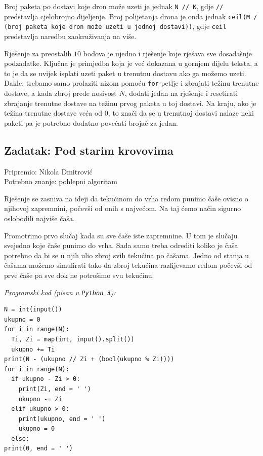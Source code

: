 \documentclass[a4paper]{article}
\begin{document}
Broj paketa po dostavi koje dron može uzeti je jednak \texttt{N // K}, gdje
\texttt{//} predstavlja cjelobrojno dijeljenje. Broj polijetanja drona je onda
jednak \texttt{ceil(M / (broj paketa koje dron može uzeti u jednoj dostavi))},
gdje \texttt{ceil} predstavlja naredbu zaokruživanja na više.

Rješenje za preostalih $10$ bodova je ujedno i rješenje koje rješava sve
dosadašnje podzadatke. Ključna je primjedba koja je već dokazana u gornjem
dijelu teksta, a to je da se uvijek isplati uzeti paket u trenutnu dostavu ako
ga možemo uzeti. Dakle, trebamo samo prolaziti nizom pomoću \texttt{for}-petlje
i zbrajati težinu trenutne dostave, a kada zbroj pređe nosivost $N$, dodati
jedan na rješenje i resetirati zbrajanje trenutne dostave na težinu prvog
paketa u toj dostavi. Na kraju, ako je težina trenutne dostave veća od $0$, to
znači da se u trenutnoj dostavi nalaze neki paketi pa je potrebno dodatno
povećati brojač za jedan.

\subsection*{Zadatak: Pod starim krovovima}
\textsf{Pripremio: Nikola Dmitrović}\\
\textsf{Potrebno znanje: pohlepni algoritam}

Rješenje se zasniva na ideji da tekućinom do vrha redom punimo čaše ovisno o
njihovoj zapremnini, počevši od onih s najvećom. Na taj ćemo način sigurno
oslobodili najviše čaša.

Promotrimo prvo slučaj kada su sve čaše iste zapremnine. U tom je slučaju
svejedno koje čaše punimo do vrha. Sada samo treba odrediti koliko je čaša
potrebno da bi se u njih ulio zbroj svih tekućina po čašama. Jedno od stanja u
čašama možemo simulirati tako da zbroj tekućina razlijevamo redom počevši od
prve čaše pa sve dok ne potrošimo svu tekućinu.

\textit{Programski kod (pisan u \texttt{Python 3}):}

\vspace{-2ex}
\begin{verbatim}
N = int(input())
ukupno = 0
for i in range(N):
  Ti, Zi = map(int, input().split())
  ukupno += Ti
print(N - (ukupno // Zi + (bool(ukupno % Zi))))
for i in range(N):
  if ukupno - Zi > 0:
    print(Zi, end = ' ')
    ukupno -= Zi
  elif ukupno > 0:
    print(ukupno, end = ' ')
    ukupno = 0
  else:
print(0, end = ' ')
\end{verbatim}
\end{document}
